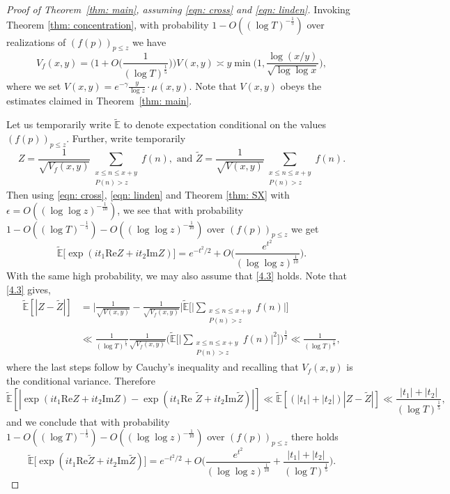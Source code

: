 \documentclass[12pt, notitlepage]{amsart}
\numberwithin{equation}{section}
\def\E{\mathbb E}
\theoremstyle{remark}
\theoremstyle{definition}
\theoremstyle{remark}
\numberwithin{equation}{section}
\begin{document}
\begin{proof}[Proof of Theorem~\ref{thm: main}, assuming \eqref{eqn: cross} and  \eqref{eqn: linden}]
Invoking Theorem \ref{thm: concentration}, with probability $1- O((\log T)^{-\frac 15})$ over realizations of $(f(p))_{p\le z}$ we have 
\begin{equation} 
\label{4.3} 
V_f(x, y) = \Big(1+O\Big(\frac{1}{(\log T)^{\frac 15}}\Big)\Big) V(x, y) \asymp y \min \Big( 1, \frac{\log (x/y)}{\sqrt{\log \log x}}\Big), 
\end{equation} 
where we set $V(x,y) = e^{-\gamma } \frac{y}{\log z} \cdot \mu(x,y)$. Note that $V(x,y)$ obeys the estimates claimed in Theorem~\ref{thm: main}.

Let us temporarily write $\tilde{\E}$ to denote expectation conditional on the values $(f(p))_{p\le z}$.  Further, write temporarily 
$$ 
Z = \frac{1}{\sqrt{V_f(x,y)}} \sum_{\substack{x\le n \le x+y \\ P(n)>z}  } f(n), \text{   and   }  {\widetilde Z} = \frac{1}{\sqrt{V(x,y)}} \sum_{\substack{x\le n \le x+y \\ P(n)>z}  } f(n).
$$
Then using \eqref{eqn: cross}, \eqref{eqn: linden} and Theorem \ref{thm: SX} with $\epsilon = O((\log\log z)^{-\frac{1}{10}})$, we see that with probability $1- O((\log T)^{-\frac 15}) -O((\log \log z)^{-\frac 1{10}})$ over $(f(p))_{p\le z}$ we get
$$ 
\tilde{\E}\Big[\exp(it_1 \text{Re} Z  + it_2 \text{Im}Z )\Big] = e^{-t^2/2} + O\Big(\frac{e^{t^2}}{(\log\log z)^{\frac 1{10}}}\Big) . 
$$
With the same high probability, we may also assume that \eqref{4.3} holds.  Note that \eqref{4.3} gives, 
\begin{align*}
\tilde{\E}[|Z-\tilde{Z}|] &= \Big| \frac{1}{\sqrt{V(x,y)}} - \frac{1}{\sqrt{V_f(x,y)}}\Big| \tilde{\E}\Big[ \Big| \sum_{\substack{x\le n \le x+y \\ P(n)>z}  } f(n)\Big|\Big] 
\\
&\ll \frac{1}{(\log T)^{\frac 15}} \frac{1}{\sqrt{V_f(x,y)}} \Big(\tilde{\E}\Big[ \Big| \sum_{\substack{x\le n \le x+y \\ P(n)>z}  } f(n)\Big|^2 \Big]\Big)^{\frac 12} 
\ll \frac{1}{(\log T)^{\frac 15}}, 
\end{align*} 
where the last steps follow by Cauchy's inequality and recalling that $V_f(x,y)$ is the conditional variance.  Therefore 
$$ 
\tilde{\E}[|\exp(it_1 \text{Re} Z+it_2 \text{Im} Z) - \exp(it_1 \text{Re }\tilde{Z} + it_2 \text{Im}\tilde{Z})|]  \ll \tilde{\E}[ (|t_1| + |t_2|) |Z-\tilde{Z}|] \ll \frac{|t_1|+|t_2|}{(\log T)^{\frac 15}}, 
$$ 
and we conclude that with probability  $1- O((\log T)^{-\frac 15}) -O((\log \log z)^{-\frac 1{10}})$ over $(f(p))_{p\le z}$ there holds 
$$ 
\tilde{\E}\Big[\exp(it_1 \text{Re} \tilde{Z}  + it_2 \text{Im}\tilde{Z} )\Big] = e^{-t^2/2} + O\Big(\frac{e^{t^2}}{(\log\log z)^{\frac 1{10}}} + \frac{|t_1|+|t_2|}{(\log T)^{\frac 15}}\Big) . 
$$
 

\end{proof}
\end{document}
